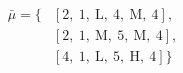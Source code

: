 \begin{equation}
\nonumber
\begin{aligned}
\bar{\mu} = \{  & \left[\text{2}, \ \text{1}, \ \text{L}, \ \text{4}, \ \text{M}, \ \text{4}\right], \\  & \left[\text{2}, \ \text{1}, \ \text{M}, \ \text{5}, \ \text{M}, \ \text{4}\right], \\  & \left[\text{4}, \ \text{1}, \ \text{L}, \ \text{5}, \ \text{H}, \ \text{4}\right]\} \\ 
\end{aligned}
\end{equation}